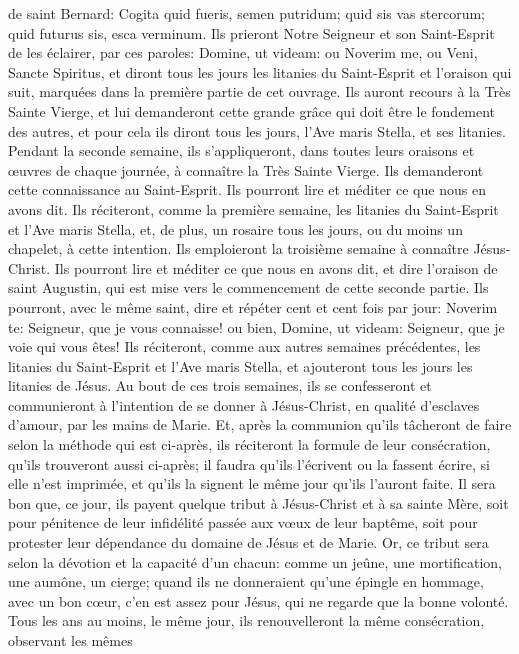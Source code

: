 de saint Bernard: Cogita quid fueris, semen putridum; quid sis vas stercorum; quid futurus sis, esca verminum. Ils
prieront Notre Seigneur et son Saint-Esprit de les éclairer, par ces paroles: Domine, ut videam: ou Noverim me, ou
Veni, Sancte Spiritus, et diront tous les jours les litanies du Saint-Esprit et l'oraison qui suit, marquées dans la
première partie de cet ouvrage. Ils auront recours à la Très Sainte Vierge, et lui demanderont cette grande grâce
qui doit être le fondement des autres, et pour cela ils diront tous les jours, l'Ave maris Stella, et ses litanies.
 Pendant la seconde semaine, ils s'appliqueront, dans toutes leurs oraisons et œuvres de chaque journée, à
connaître la Très Sainte Vierge. Ils demanderont cette connaissance au Saint-Esprit. Ils pourront lire et méditer ce
que nous en avons dit. Ils réciteront, comme la première semaine, les litanies du Saint-Esprit et l'Ave maris Stella,
et, de plus, un rosaire tous les jours, ou du moins un chapelet, à cette intention.
 Ils emploieront la troisième semaine à connaître Jésus-Christ. Ils pourront lire et méditer ce que nous en
avons dit, et dire l'oraison de saint Augustin, qui est mise vers le commencement de cette seconde partie. Ils
pourront, avec le même saint, dire et répéter cent et cent fois par jour: Noverim te: Seigneur, que je vous
connaisse! ou bien, Domine, ut videam: Seigneur, que je voie qui vous êtes! Ils réciteront, comme aux autres
semaines précédentes, les litanies du Saint-Esprit et l'Ave maris Stella, et ajouteront tous les jours les litanies de
Jésus.
 Au bout de ces trois semaines, ils se confesseront et communieront à l'intention de se donner à Jésus-Christ,
en qualité d'esclaves d'amour, par les mains de Marie. Et, après la communion qu'ils tâcheront de faire selon la
méthode qui est ci-après, ils réciteront la formule de leur consécration, qu'ils trouveront aussi ci-après; il faudra
qu'ils l'écrivent ou la fassent écrire, si elle n'est imprimée, et qu'ils la signent le même jour qu'ils l'auront faite.
 Il sera bon que, ce jour, ils payent quelque tribut à Jésus-Christ et à sa sainte Mère, soit pour pénitence de
leur infidélité passée aux vœux de leur baptême, soit pour protester leur dépendance du domaine de Jésus et de
Marie. Or, ce tribut sera selon la dévotion et la capacité d'un chacun: comme un jeûne, une mortification, une
aumône, un cierge; quand ils ne donneraient qu'une épingle en hommage, avec un bon cœur, c'en est assez pour
Jésus, qui ne regarde que la bonne volonté.
 Tous les ans au moins, le même jour, ils renouvelleront la même consécration, observant les mêmes
